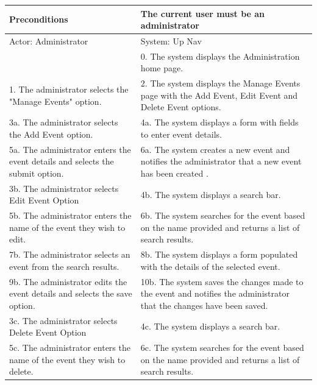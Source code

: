 \documentclass{article}
\begin{document}
\begin{center}
\begin{enumerate}
\begin{enumerate}
	\begin{table}[]
	\centering
		\begin{tabular}{ | m{15em} | m{15em}| }
		\hline
		Preconditions                                                       										& The current user must be an administrator \\ 				
		\hline
		Actor: Administrator                                                       									& System: Up Nav \\ 			
		\hline
                                                                  													& 0. The system displays the Administration home page. \\                                                           
		 \hline
		1. The administrator selects the "Manage Events" option.									& 2. The system displays the Manage Events page with the Add Event, Edit Event and Delete Event options. \\
		\hline							
		3a. The administrator selects the Add Event option.										& 4a. The system displays a form with fields to enter event details. \\
		 \hline
		5a. The administrator enters the event details and selects the submit option. 						& 6a.  The system creates a new event and notifies the administrator that a new event has been created . \\
		\hline
		3b. The administrator selects Edit Event Option										& 4b. The system displays a search bar.\\
		\hline
		5b. The administrator enters the name of the event they wish to edit.							& 6b. The system searches for the event based on the name provided and returns a list of search results. \\
		\hline
		7b. The administrator selects an event from the search results.								& 8b. The system displays a form populated with the details of the selected event. \\
		\hline
		9b. The administrator edits the event details and selects the save option.						& 10b. The system saves the changes made to the event and notifies the administrator that the changes have been saved. \\
		\hline
		3c. The administrator selects Delete Event Option										& 4c. The system displays a search bar.\\
		\hline
		5c. The administrator enters the name of the event they wish to delete.							& 6c. The system searches for the event based on the name provided and returns a list of search results. \\

\end{tabular}
\end{table}
\end{enumerate}
\end{enumerate}
\end{center}
\end{document}
